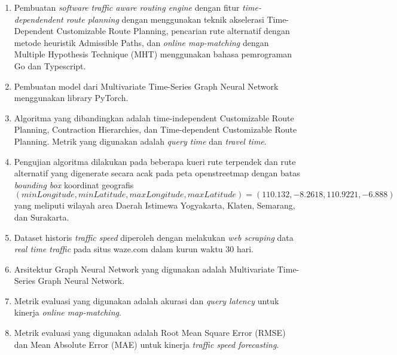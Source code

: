 \begin{enumerate}
    \item Pembuatan \textit{software} \textit{traffic aware routing engine} dengan fitur \textit{time-dependendent route planning} dengan menggunakan teknik akselerasi Time-Dependent Customizable Route Planning, pencarian rute alternatif dengan metode heuristik Admissible Paths, dan \textit{online map-matching } dengan Multiple Hypothesis Technique (MHT) menggunakan bahasa pemrograman Go dan Typescript.
    \item Pembuatan model dari Multivariate Time-Series Graph Neural Network menggunakan library PyTorch.
    \item Algoritma yang dibandingkan adalah time-independent Customizable Route Planning, Contraction Hierarchies, dan Time-dependent Customizable Route Planning. Metrik yang digunakan adalah \textit{query time} dan \textit{travel time}.
    \item Pengujian algoritma dilakukan pada beberapa kueri rute terpendek dan rute alternatif yang digenerate secara acak pada peta openstreetmap dengan batas \textit{bounding box} koordinat geografis $(minLongitude,minLatitude,maxLongitude,maxLatitude)=(110.132,-8.2618,110.9221,-6.888)$ yang meliputi wilayah area Daerah Istimewa Yogyakarta, Klaten, Semarang, dan Surakarta. 
  
    \item Dataset historis \textit{traffic speed} diperoleh dengan melakukan \textit{web scraping} data \textit{real time traffic} pada situs waze.com dalam kurun waktu 30 hari.
    \item Arsitektur Graph Neural Network yang digunakan adalah Multivariate Time-Series Graph Neural Network.
    \item Metrik evaluasi yang digunakan adalah akurasi dan \textit{query latency} untuk kinerja \textit{online map-matching}.
    \item Metrik evaluasi yang digunakan adalah Root Mean Square Error (RMSE) dan Mean Absolute Error (MAE) untuk kinerja \textit{traffic speed forecasting}.
\end{enumerate}